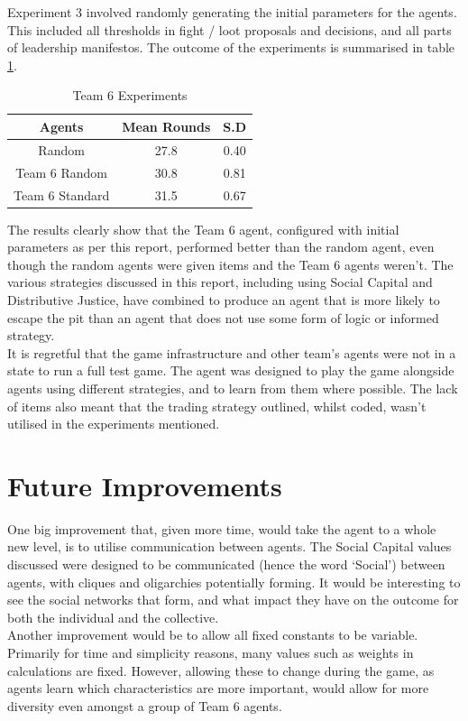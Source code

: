 Experiment 3 involved randomly generating the initial parameters for the agents. This included all thresholds in fight / loot proposals and decisions, and all parts of leadership manifestos. The outcome of the experiments is summarised in table \ref{tab:T6Experiments}.

\begin{table}[h]
    \centering
    \begin{tabular}{||c|c|c||}
        \hline
       Agents & Mean Rounds & S.D\\
       \hline \hline
       Random & 27.8 & 0.40\\
       \hline
       Team 6 Random & 30.8 & 0.81\\
       \hline
       Team 6 Standard & 31.5 & 0.67\\
       \hline
    \end{tabular}
    \caption{Team 6 Experiments}
    \label{tab:T6Experiments}
\end{table}

The results clearly show that the Team 6 agent, configured with initial parameters as per this report, performed better than the random agent, even though the random agents were given items and the Team 6 agents weren't. The various strategies discussed in this report, including using Social Capital and Distributive Justice, have combined to produce an agent that is more likely to escape the pit than an agent that does not use some form of logic or informed strategy.\\

It is regretful that the game infrastructure and other team's agents were not in a state to run a full test game. The agent was designed to play the game alongside agents using different strategies, and to learn from them where possible. The lack of items also meant that the trading strategy outlined, whilst coded, wasn't utilised in the experiments mentioned.

\section{Future Improvements}

One big improvement that, given more time, would take the agent to a whole new level, is to utilise communication between agents. The Social Capital values discussed were designed to be communicated (hence the word `Social') between agents, with cliques and oligarchies potentially forming. It would be interesting to see the social networks that form, and what impact they have on the outcome for both the individual and the collective.\\

Another improvement would be to allow all fixed constants to be variable. Primarily for time and simplicity reasons, many values such as weights in calculations are fixed. However, allowing these to change during the game, as agents learn which characteristics are more important, would allow for more diversity even amongst a group of Team 6 agents.
